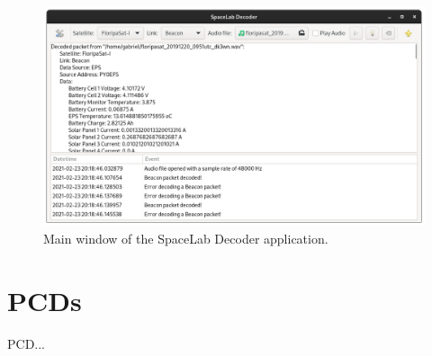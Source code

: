 \begin{figure}[!ht]
    \begin{center}
        \includegraphics[width=\textwidth]{figures/spacelab-decoder.png}
        \caption{Main window of the SpaceLab Decoder application.}
        \label{fig:spacelab-decoder}
    \end{center}
\end{figure}

\section{PCDs}

PCD...
